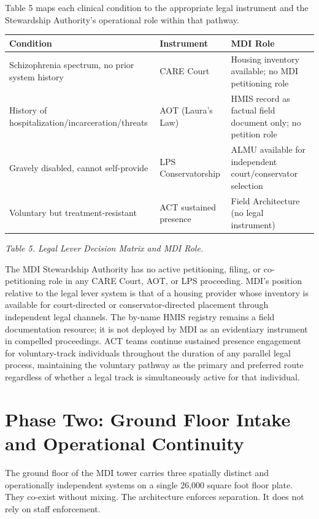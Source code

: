 \documentclass[12pt, letterpaper]{article}
\begin{document}
Table 5 maps each clinical condition to the appropriate legal instrument and the Stewardship Authority's operational role within that pathway.

{\singlespacing
\begin{tabularx}{\textwidth}{@{}p{4.5cm}Xp{4cm}@{}}
\toprule
\rowcolor{rowgray}
Condition & Instrument & MDI Role \\
\midrule
Schizophrenia spectrum, no prior system history & CARE Court & Housing inventory available; no MDI petitioning role \\
\rowcolor{rowgray}
History of hospitalization/incarceration/threats & AOT (Laura's Law) & HMIS record as factual field document only; no petition role \\
Gravely disabled, cannot self-provide & LPS Conservatorship & ALMU available for independent court/conservator selection \\
\rowcolor{rowgray}
Voluntary but treatment-resistant & ACT sustained presence & Field Architecture (no legal instrument) \\
\bottomrule
\end{tabularx}\par
\vspace{8pt}
\noindent\textit{Table 5. Legal Lever Decision Matrix and MDI Role.}
\par}
The MDI Stewardship Authority has no active petitioning, filing, or co-petitioning role in any CARE Court, AOT, or LPS proceeding. MDI's position relative to the legal lever system is that of a housing provider whose inventory is available for court-directed or conservator-directed placement through independent legal channels. The by-name HMIS registry remains a field documentation resource; it is not deployed by MDI as an evidentiary instrument in compelled proceedings. ACT teams continue sustained presence engagement for voluntary-track individuals throughout the duration of any parallel legal process, maintaining the voluntary pathway as the primary and preferred route regardless of whether a legal track is simultaneously active for that individual.

\clearpage
\section{Phase Two: Ground Floor Intake and Operational Continuity}

The ground floor of the MDI tower carries three spatially distinct and operationally independent systems on a single 26,000 square foot floor plate. They co-exist without mixing. The architecture enforces separation. It does not rely on staff enforcement.
\end{document}
